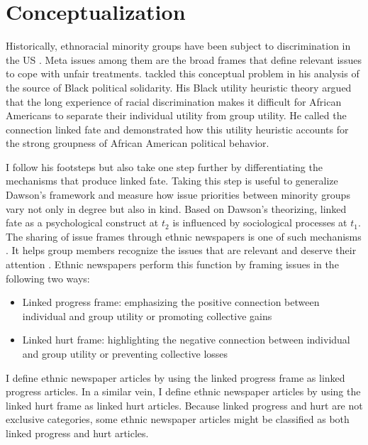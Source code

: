\documentclass[12 pt]{article}
\begin{document}
\section{Conceptualization}

Historically, ethnoracial minority groups have been subject to discrimination in the US \citep{chae2008unfair, hwang2008impact, rothstein2017color, trounstine2018segregation, reardon2019geography, williams2019racism}. Meta issues among them are the broad frames that define relevant issues to cope with unfair treatments. \citet{dawson1994behind} tackled this conceptual problem in his analysis of the source of Black political solidarity. His Black utility heuristic theory argued that the long experience of racial discrimination makes it difficult for African Americans to separate their individual utility from group utility. He called the connection linked fate and demonstrated how this utility heuristic accounts for the strong groupness of African American political behavior.

I follow his footsteps but also take one step further by differentiating the mechanisms that produce linked fate. Taking this step is useful to generalize Dawson's framework and measure how issue priorities between minority groups vary not only in degree but also in kind. Based on Dawson's theorizing, linked fate as a psychological construct at $t_{2}$ is influenced by sociological processes at $t_{1}$. The sharing of issue frames through ethnic newspapers is one of such mechanisms \citep[56-61]{dawson1994behind}. It helps group members recognize the issues that are relevant and deserve their attention \citep[1058]{nelson1996issue}. Ethnic newspapers perform this function by framing issues in the following two ways: 

\begin{itemize}
\item Linked progress frame: emphasizing the positive connection between individual and group utility or promoting collective gains 
\item Linked hurt frame: highlighting the negative connection between individual and group utility or preventing collective losses 
\end{itemize}

I define ethnic newspaper articles by using the linked progress frame as linked progress articles. In a similar vein, I define ethnic newspaper articles by using the linked hurt frame as linked hurt articles. Because linked progress and hurt are not exclusive categories, some ethnic newspaper articles might be classified as both linked progress and hurt articles.
\end{document}
